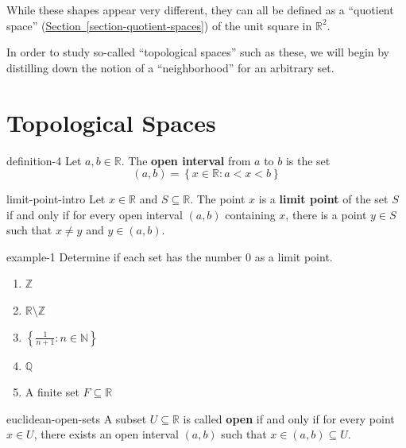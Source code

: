 \documentclass[10pt,]{article}
\newcommand{\terminology}[1]{\textbf{#1}}
\newcommand{\mb}{\mathbb}
\newcommand{\setBuilder}[2]{\left\{#1:#2\right\}}
\newcommand{\lt}{<}
\begin{document}
\hypertarget{p-18}{}%
While these shapes appear very different, they can all be defined as a ``quotient space'' (\hyperref[section-quotient-spaces]{Section~\ref{section-quotient-spaces}}) of the unit square in \(\mathbb R^2\).%
\par
\hypertarget{p-19}{}%
In order to study so-called ``topological spaces'' such as these, we will begin by distilling down the notion of a ``neighborhood'' for an arbitrary set.%
%
%
\typeout{************************************************}
\typeout{************************************************}
%
\section[{Topological Spaces}]{Topological Spaces}\label{section-topological-spaces}
\begin{definition}{}{definition-4}%
\hypertarget{p-20}{}%
Let \(a,b\in\mb R\). The \terminology{open interval} from \(a\) to \(b\) is the set%
%
\begin{equation*}
(a,b)=\setBuilder{x\in\mb R}{a\lt x\lt b}
\end{equation*}
\end{definition}
\begin{definition}{}{limit-point-intro}%
\hypertarget{p-21}{}%
Let \(x\in\mb R\) and \(S\subseteq\mb R\). The point \(x\) is a \terminology{limit point} of the set \(S\) if and only if for every open interval \((a,b)\) containing \(x\), there is a point \(y\in S\) such that \(x\not=y\) and \(y\in(a,b)\).%
\end{definition}
\begin{example}{}{example-1}%
\hypertarget{p-22}{}%
Determine if each set has the number \(0\) as a limit point.%
\leavevmode%
\begin{enumerate}
\item\hypertarget{li-3}{}\(\mb Z\)%
\item\hypertarget{li-4}{}\(\mb R\setminus\mb Z\)%
\item\hypertarget{li-5}{}\(\setBuilder{\frac{1}{n+1}}{n\in\mb N}\)%
\item\hypertarget{li-6}{}\(\mb Q\)%
\item\hypertarget{li-7}{}A finite set \(F\subseteq\mb R\)%
\end{enumerate}
\end{example}
\begin{definition}{}{euclidean-open-sets}%
\hypertarget{p-23}{}%
A subset \(U\subseteq\mb R\) is called \terminology{open} if and only if for every point \(x\in U\), there exists an open interval \((a,b)\) such that \(x\in(a,b)\subseteq U\).%
\end{definition}
\end{document}
